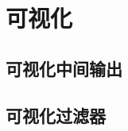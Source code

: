 \documentclass[lang=cn,11pt]{elegantpaper}
\begin{document}
\section{可视化}

\subsection{可视化中间输出}

\subsection{可视化过滤器}






\newpage
\nocite{*}



\end{document}
